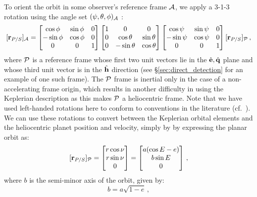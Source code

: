To orient the orbit in some observer's reference frame $\mathcal A$, we apply a 3-1-3 rotation using the angle set $(\psi,\theta,\phi)_{\mathcal A}$ \citep{kane}:
\begin{equation}\label{eq:rpsrot}
[\mathbf r_{P/S}]_{\mathcal A}  =
\left[ \begin{matrix} \cos\phi &\sin\phi & 0 \\ -\sin\phi& \cos\phi & 0 \\ 0 & 0 & 1 \end{matrix}\right]
\left[ \begin{matrix} 1 & 0 & 0 \\ 0 & \cos\theta &\sin\theta \\0 & -\sin\theta & \cos\theta \end{matrix}\right]
\left[ \begin{matrix} \cos\psi &\sin\psi & 0 \\ -\sin\psi & \cos\psi & 0 \\ 0 & 0 & 1 \end{matrix}\right]
[\mathbf r_{P/S}]_{\mathcal P}   \,,
\end{equation}
where $\mathcal P$ is a reference frame whose first two unit vectors lie in the $\hat{\mathbf e},  \hat{\mathbf q}$ plane and whose third unit vector is in the $\hat{\mathbf h}$ direction
(see \S\ref{sec:direct_detection} for an example of one such frame).  The  $\mathcal P$ frame is inertial only in the case of a non-accelerating frame origin, which results in another difficulty in using the Keplerian description as this makes $\mathcal P$ a heliocentric frame.  Note that we have used left-handed rotations here to conform to conventions in the literature (cf.~\citet{vinti}).  We can use these rotations to convert between the Keplerian orbital elements and the heliocentric planet position and velocity, simply by by expressing the planar orbit as:
\begin{equation}\label{eq:rpsP1}
[\mathbf r_{P/S}]_{\mathcal P}  = \left[\begin{matrix} r \cos \nu \\ r \sin \nu \\ 0 \end{matrix} \right] = \left[\begin{matrix} a (\cos E - e) \\ b \sin E \\ 0 \end{matrix} \right] \,,
\end{equation}
where $b$ is the semi-minor axis of the orbit, given by:
\begin{equation}
b = a\sqrt{1 - e} \,,
\end{equation}
